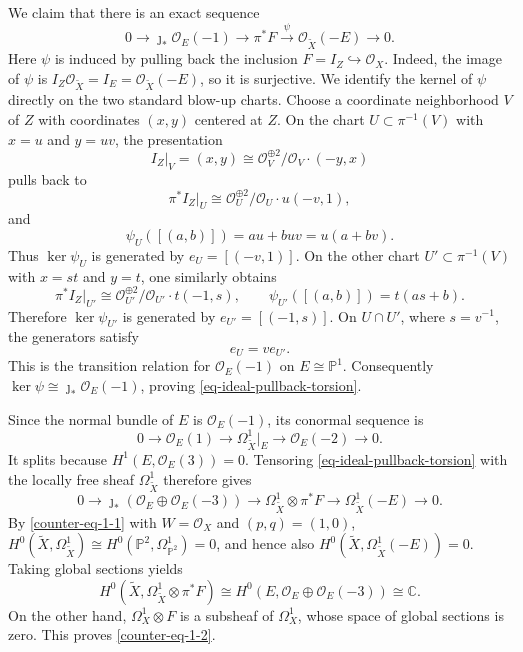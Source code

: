 \documentclass[11pt]{amsart}
\numberwithin{equation}{section}
\theoremstyle{plain}
\theoremstyle{definition}
\begin{document}
We claim that there is an exact sequence
\begin{equation}\label{eq-ideal-pullback-torsion}
0\longrightarrow \jmath_*\mathcal O_E(-1)
\longrightarrow\pi^*F
\xrightarrow{\psi}\mathcal O_{\tilde{X}}(-E)
\longrightarrow0.
\end{equation}
Here \(\psi\) is induced by pulling back the inclusion \(F = I_Z \hookrightarrow \mathcal{O}_X\). Indeed,
 the image of $\psi$ is \(I_Z \mathcal{O}_{\tilde X} = I_E = \mathcal{O}_{\tilde X}(-E)\), so it is surjective. 
We identify the kernel of $\psi$ directly on the two standard blow-up charts.
Choose a coordinate neighborhood \(V\) of \(Z\) with coordinates \((x,y)\) centered at \(Z\). 
On the chart \(U \subset \pi^{-1}(V)\) with \(x = u\) and \(y = uv\), the presentation
\[
I_Z|_V = (x,y) \cong \mathcal{O}_V^{\oplus 2} / \mathcal{O}_V \cdot (-y,x)
\]
pulls back to
\[
\pi^* I_Z|_U \cong \mathcal{O}_U^{\oplus 2} / \mathcal{O}_U \cdot u(-v,1),
\]
and
\[
\psi_U([(a,b)]) = au + buv = u(a+bv).
\]
Thus \(\ker \psi_U\) is generated by \(e_U = [(-v,1)]\). On the other chart \(U'\subset \pi^{-1}(V)\) with 
\(x = st\) and \(y = t\), one similarly obtains
\[
\pi^* I_Z|_{U'} \cong \mathcal{O}_{U'}^{\oplus 2} / \mathcal{O}_{U'} \cdot t(-1,s), 
\qquad \psi_{U'}([(a,b)]) = t(as+b).
\]
Therefore \(\ker \psi_{U'}\) is generated by \(e_{U'} = [(-1,s)]\). 
On \(U \cap U'\), where \(s = v^{-1}\), the generators satisfy
\[
e_U = v e_{U'}.
\]
This is the transition relation for \(\mathcal{O}_E(-1)\) on \(E \cong \mathbb{P}^1\). 
Consequently \(\ker \psi \cong \jmath_* \mathcal{O}_E(-1)\),
proving \eqref{eq-ideal-pullback-torsion}.

Since the normal bundle of $E$ is $\mathcal O_E(-1)$, its conormal
sequence is
\[
0\longrightarrow\mathcal O_E(1)
\longrightarrow\Omega^1_{\tilde{X}}|_E
\longrightarrow\mathcal O_E(-2)\longrightarrow0.
\]
It splits because $H^1(E,\mathcal O_E(3))=0$.  Tensoring
\eqref{eq-ideal-pullback-torsion} with the locally free sheaf
$\Omega^1_{\tilde{X}}$ therefore gives
\[
0\longrightarrow \jmath_*(\mathcal O_E\oplus\mathcal O_E(-3))
\longrightarrow\Omega^1_{\tilde{X}}\otimes\pi^*F
\longrightarrow\Omega^1_{\tilde{X}}(-E)\longrightarrow0.
\]
By \eqref{counter-eq-1-1} with $W=\mathcal O_X$ and $(p,q)=(1,0)$,
$H^0(\tilde{X},\Omega^1_{\tilde{X}})\cong H^0(\mathbb P^2,\Omega^1_{\mathbb P^2})=0$,
and hence also
$H^0(\tilde{X},\Omega^1_{\tilde{X}}(-E))=0$.  Taking global sections yields
\[
H^0(\tilde{X},\Omega^1_{\tilde{X}}\otimes\pi^*F)
\cong H^0(E,\mathcal O_E\oplus\mathcal O_E(-3))\cong\mathbb C.
\]
On the other hand, $\Omega_X^1\otimes F$ is a subsheaf of $\Omega_X^1$,
whose space of global sections is zero.  This proves
\eqref{counter-eq-1-2}.
\end{document}
